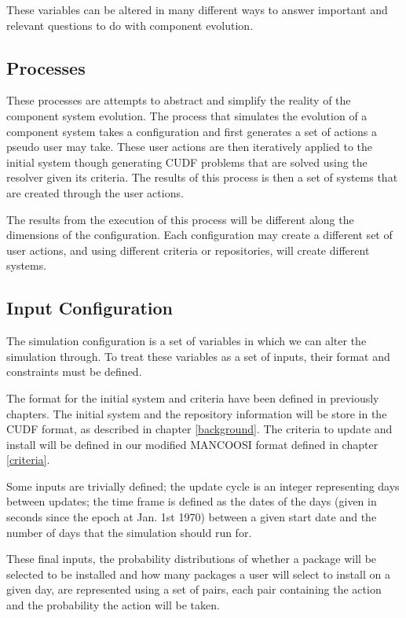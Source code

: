 These variables can be altered in many different ways to answer important and relevant questions to do with component evolution.


\subsection{Processes}
These processes are attempts to abstract and simplify the reality of the component system evolution.
The process that simulates the evolution of a component system takes a configuration and first generates a set of actions a pseudo user may take.
These user actions are then iteratively applied to the initial system though generating CUDF problems that are solved using the resolver given its criteria.
The results of this process is then a set of systems that are created through the user actions.
 
The results from the execution of this process will be different along the dimensions of the configuration.
Each configuration may create a different set of user actions, and using different criteria or repositories, will create different systems.

\subsection{Input Configuration}
The simulation configuration is a set of variables in which we can alter the simulation through.
To treat these variables as a set of inputs, their format and constraints must be defined.

The format for the initial system and criteria have been defined in previously chapters.
The initial system and the repository information will be store in the CUDF format, as described in chapter \ref{background}. 
The criteria to update and install will be defined in our modified MANCOOSI format defined in chapter \ref{criteria}.

Some inputs are trivially defined;
the update cycle is an integer representing days between updates;
the time frame is defined as the dates of the days (given in seconds since the epoch at Jan. 1st 1970) between a given start date and the number of days that the simulation should run for.

These final inputs, the probability distributions of whether a package will be selected to be installed and how many packages a user will select to install on a given day,
are represented using a set of pairs, each pair containing the action and the probability the action will be taken.

